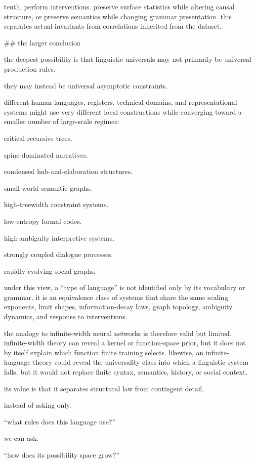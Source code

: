 tenth, perform interventions. preserve surface statistics while altering causal structure, or preserve semantics while changing grammar presentation. this separates actual invariants from correlations inherited from the dataset.

## the larger conclusion

the deepest possibility is that linguistic universals may not primarily be universal production rules.

they may instead be universal asymptotic constraints.

different human languages, registers, technical domains, and representational systems might use very different local constructions while converging toward a smaller number of large-scale regimes:

critical recursive trees.

spine-dominated narratives.

condensed hub-and-elaboration structures.

small-world semantic graphs.

high-treewidth constraint systems.

low-entropy formal codes.

high-ambiguity interpretive systems.

strongly coupled dialogue processes.

rapidly evolving social graphs.

under this view, a “type of language” is not identified only by its vocabulary or grammar. it is an equivalence class of systems that share the same scaling exponents, limit shapes, information-decay laws, graph topology, ambiguity dynamics, and response to interventions.

the analogy to infinite-width neural networks is therefore valid but limited. infinite-width theory can reveal a kernel or function-space prior, but it does not by itself explain which function finite training selects. likewise, an infinite-language theory could reveal the universality class into which a linguistic system falls, but it would not replace finite syntax, semantics, history, or social context.

its value is that it separates structural law from contingent detail.

instead of asking only:

“what rules does this language use?”

we can ask:

“how does its possibility space grow?”

